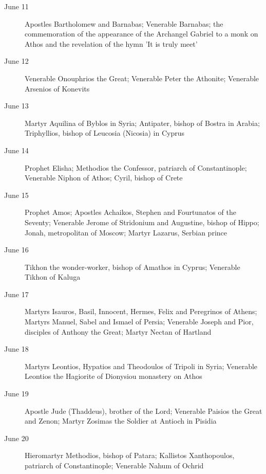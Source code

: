 \begin{description}
\item[June 11]

Apostles Bartholomew and Barnabas; Venerable Barnabas; the commemoration of the appearance of the Archangel Gabriel to a monk on Athos and the revelation of the hymn 'It is truly meet'

\item[June 12]

Venerable Onouphrios the Great; Venerable Peter the Athonite; Venerable Arsenios of Konevits

\item[June 13]

Martyr Aquilina of Byblos in Syria; Antipater, bishop of Bostra in Arabia; Triphyllios, bishop of Leucosia (Nicosia) in Cyprus

\item[June 14]

Prophet Elisha; Methodios the Confessor, patriarch of Constantinople; Venerable Niphon of Athos; Cyril, bishop of Crete

\item[June 15]

Prophet Amos; Apostles Achaikos, Stephen and Fourtunatos of the Seventy; Venerable Jerome of Stridonium and Augustine, bishop of Hippo; Jonah, metropolitan of Moscow; Martyr Lazarus, Serbian prince

\item[June 16]

Tikhon the wonder-worker, bishop of Amathos in Cyprus; Venerable Tikhon of Kaluga

\item[June 17]

Martyrs Isauros, Basil, Innocent, Hermes, Felix and Peregrinos of Athens; Martyrs Manuel, Sabel and Ismael of Persia; Venerable Joseph and Pior, disciples of Anthony the Great; Martyr Nectan of Hartland

\item[June 18]

Martyrs Leontios, Hypatios and Theodoulos of Tripoli in Syria; Venerable Leontios the Hagiorite of Dionysiou monastery on Athos

\item[June 19]

Apostle Jude (Thaddeus), brother of the Lord; Venerable Paisios the Great and Zenon; Martyr Zosimas the Soldier at Antioch in Pisidia

\item[June 20]

Hieromartyr Methodios, bishop of Patara; Kallistos Xanthopoulos, patriarch of Constantinople; Venerable Nahum of Ochrid


\end{description}
